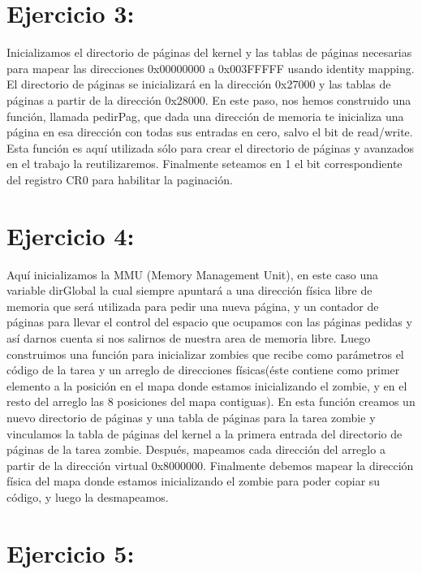 \documentclass[a4paper]{article}
\begin{document}
\clearpage

\section{Ejercicio 3:}
%

Inicializamos el directorio de páginas del kernel y las tablas de páginas necesarias para mapear las direcciones 0x00000000 a 0x003FFFFF usando identity mapping. El directorio de páginas se inicializará en la dirección 0x27000 y las tablas de páginas a partir de la dirección 0x28000. En este paso, nos hemos construido una función, llamada pedirPag, que dada una dirección de memoria te inicializa una página en esa dirección con todas sus entradas en cero, salvo el bit de read/write. Esta función es aquí utilizada sólo para crear el directorio de páginas y avanzados en el trabajo la reutilizaremos. Finalmente seteamos en 1 el bit correspondiente del registro CR0 para habilitar la paginación.

\clearpage

\section{Ejercicio 4:}
%

Aquí inicializamos la MMU (Memory Management Unit), en este caso una variable dirGlobal la cual siempre apuntará a una dirección física libre de memoria que será utilizada para pedir una nueva página, y un contador de páginas para llevar el control del espacio que ocupamos con las páginas pedidas y así darnos cuenta si nos salirnos de nuestra area de memoria libre. Luego construimos una función para inicializar zombies que recibe como parámetros el código de la tarea y un arreglo de direcciones físicas(éste contiene como primer elemento a la posición en el mapa donde estamos inicializando el zombie, y en el resto del arreglo las 8 posiciones del mapa contiguas). En esta función creamos un nuevo directorio de páginas y una tabla de páginas para la tarea zombie y vinculamos la tabla de páginas del kernel a la primera entrada del directorio de páginas de la tarea zombie. Después, mapeamos cada dirección del arreglo a partir de la dirección virtual 0x8000000. Finalmente debemos mapear la dirección física del mapa donde estamos inicializando el zombie para poder copiar su código, y luego la desmapeamos.

\clearpage

\section{Ejercicio 5:}
%
\end{document}

